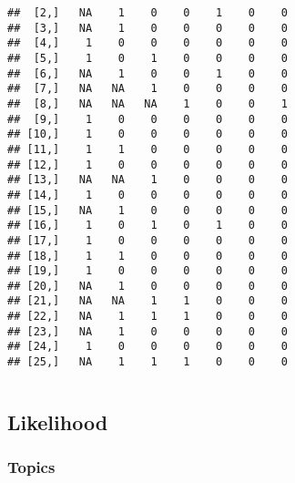 \documentclass[color=usenames,dvipsnames]{beamer}\usepackage[]{graphicx}\usepackage[]{color}
\makeatletter
\newenvironment{kframe}{%
 \def\at@end@of@kframe{}%
 \ifinner\ifhmode%
  \def\at@end@of@kframe{\end{minipage}}%
  \begin{minipage}{\columnwidth}%
 \fi\fi%
 \def\FrameCommand##1{\hskip\@totalleftmargin \hskip-\fboxsep
 \colorbox{shadecolor}{##1}\hskip-\fboxsep
     \hskip-\linewidth \hskip-\@totalleftmargin \hskip\columnwidth}%
 \MakeFramed {\advance\hsize-\width
   \@totalleftmargin\z@ \linewidth\hsize
   \@setminipage}}%
 {\par\unskip\endMakeFramed%
 \at@end@of@kframe}
\newenvironment{knitrout}{}{} %
\makeatother
\begin{document}
\begin{frame}[fragile]
\begin{columns}
\begin{column}{0.5\textwidth}
\begin{knitrout}
\begin{kframe}
\begin{verbatim}
##  [2,]   NA    1    0    0    1    0    0
##  [3,]   NA    1    0    0    0    0    0
##  [4,]    1    0    0    0    0    0    0
##  [5,]    1    0    1    0    0    0    0
##  [6,]   NA    1    0    0    1    0    0
##  [7,]   NA   NA    1    0    0    0    0
##  [8,]   NA   NA   NA    1    0    0    1
##  [9,]    1    0    0    0    0    0    0
## [10,]    1    0    0    0    0    0    0
## [11,]    1    1    0    0    0    0    0
## [12,]    1    0    0    0    0    0    0
## [13,]   NA   NA    1    0    0    0    0
## [14,]    1    0    0    0    0    0    0
## [15,]   NA    1    0    0    0    0    0
## [16,]    1    0    1    0    1    0    0
## [17,]    1    0    0    0    0    0    0
## [18,]    1    1    0    0    0    0    0
## [19,]    1    0    0    0    0    0    0
## [20,]   NA    1    0    0    0    0    0
## [21,]   NA   NA    1    1    0    0    0
## [22,]   NA    1    1    1    0    0    0
## [23,]   NA    1    0    0    0    0    0
## [24,]    1    0    0    0    0    0    0
## [25,]   NA    1    1    1    0    0    0
\end{verbatim}
\end{kframe}
\end{knitrout}
    \end{column}
  \end{columns}
\end{frame}



\subsection{Likelihood}


\begin{frame}[plain]
  \frametitle{Topics}
  \Large
\end{frame}
\end{document}
